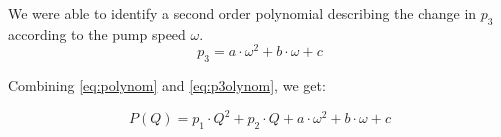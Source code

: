 We were able to identify a second order polynomial describing the change in $p_3$ according to the pump speed $\omega$.
\begin{equation}
	 p_3 = a \cdot \omega^2 + b \cdot \omega + c
	 \label{eq:p3olynom}
\end{equation}

Combining \ref{eq:polynom} and \ref{eq:p3olynom}, we get:

\begin{equation}
	P(Q) = p_1 \cdot Q^2 + p_2 \cdot Q + a \cdot \omega^2 + b \cdot \omega + c 
\end{equation}
